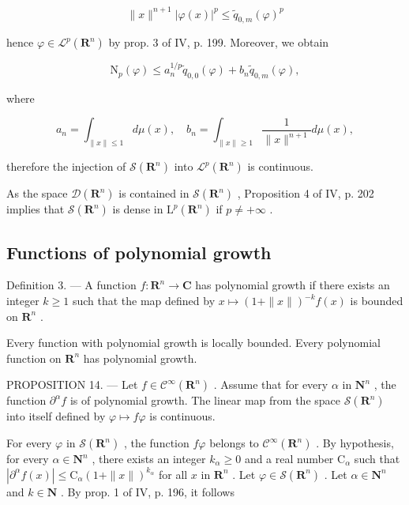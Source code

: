 \[
\| x \| ^ {n + 1} | \varphi (x) | ^ {p} \leqslant \widetilde {q} _ {0, m} (\varphi) ^ {p}
\]

hence \(\varphi \in \mathcal{L}^p (\mathbf{R}^n)\) by prop. 3 of IV, p. 199. Moreover, we obtain

\[
\mathrm{N} _ {p} (\varphi) \leqslant a _ {n} ^ {1 / p} \widetilde {q} _ {0, 0} (\varphi) + b _ {n} \widetilde {q} _ {0, m} (\varphi),
\]

where

\[
a _ {n} = \int_ {\| x \| \leqslant 1} d \mu (x), \quad b _ {n} = \int_ {\| x \| \geqslant 1} \frac {1}{\| x \| ^ {n + 1}} d \mu (x),
\]

therefore the injection of \(\mathcal{S}(\mathbf{R}^n)\) into \(\mathcal{L}^p (\mathbf{R}^n)\) is continuous.

As the space \(\mathcal{D}(\mathbf{R}^n)\) is contained in \(\mathcal{S}(\mathbf{R}^n)\) , Proposition 4 of IV, p. 202 implies that \(\mathcal{S}(\mathbf{R}^n)\) is dense in \(\mathrm{L}^p (\mathbf{R}^n)\) if \(p\neq +\infty\) .

\subsection{Functions of polynomial growth}

Definition 3. --- A function \(f\colon\mathbf{R}^{n}\to\mathbf{C}\) has polynomial growth if there exists an integer \(k\geqslant1\) such that the map defined by \(x\mapsto(1+\|x\|)^{-k}f(x)\) is bounded on \(\mathbf{R}^{n}\) .

Every function with polynomial growth is locally bounded. Every polynomial function on \(\mathbf{R}^{n}\) has polynomial growth.

PROPOSITION 14. --- Let \(f \in \mathcal{C}^{\infty}(\mathbf{R}^{n})\) . Assume that for every \(\alpha\) in \(\mathbf{N}^{n}\) , the function \(\partial^{\alpha}f\) is of polynomial growth. The linear map from the space \(\mathcal{S}(\mathbf{R}^{n})\) into itself defined by \(\varphi \mapsto f\varphi\) is continuous.

For every \(\varphi\) in \(\mathcal{S}(\mathbf{R}^{n})\) , the function \(f\varphi\) belongs to \(\mathcal{C}^{\infty}(\mathbf{R}^{n})\) . By hypothesis, for every \(\alpha \in \mathbf{N}^{n}\) , there exists an integer \(k_{\alpha} \geqslant 0\) and a real number \(\mathrm{C}_{\alpha}\) such that \(|\partial^{\alpha}f(x)| \leqslant \mathrm{C}_{\alpha}(1 + \|x\|)^{k_{\alpha}}\) for all \(x\) in \(\mathbf{R}^{n}\) . Let \(\varphi \in \mathcal{S}(\mathbf{R}^{n})\) . Let \(\alpha \in \mathbf{N}^{n}\) and \(k \in \mathbf{N}\) . By prop. 1 of IV, p. 196, it follows

